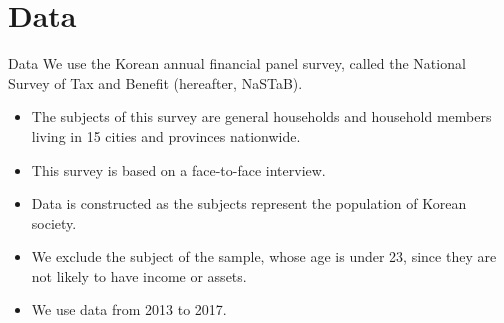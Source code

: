 \documentclass[
  ignorenonframetext,
  aspectratio=169,
]{beamer}
\providecommand{\tightlist}{%
  \setlength{\itemsep}{0pt}\setlength{\parskip}{0pt}}
\begin{document}
\hypertarget{data}{%
\section{Data}\label{data}}

\begin{frame}{Data}
\protect\hypertarget{data-1}{}
We use the Korean annual financial panel survey,
called the National Survey of Tax and Benefit (hereafter, NaSTaB).

\begin{itemize}
\tightlist
\item
  The subjects of this survey are general households and household members living in 15 cities and provinces nationwide.
\item
  This survey is based on a face-to-face interview.
\item
  Data is constructed as the subjects represent the population of Korean society.
\item
  We exclude the subject of the sample, whose age is under 23, since they are not likely to have income or assets.
\item
  We use data from 2013 to 2017.
\end{itemize}
\end{frame}
\end{document}
